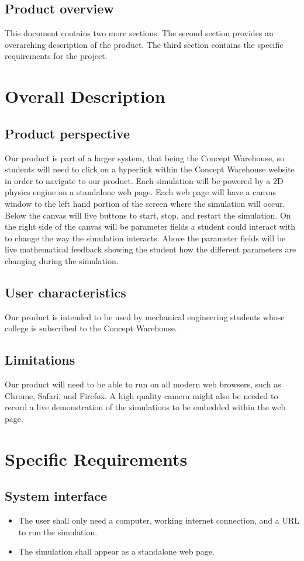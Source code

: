 \subsection{Product overview}
This document contains two more sections. The second section provides an overarching description of the product. The third section contains the specific requirements for the project.
\section{Overall Description}
\subsection{Product perspective}
Our product is part of a larger system, that being the Concept Warehouse, so students will need to click on a hyperlink within the Concept Warehouse website in order to navigate to our product. Each simulation will be powered by a 2D physics engine on a standalone web page. Each web page will have a canvas window to the left hand portion of the screen where the simulation will occur. Below the canvas will live buttons to start, stop, and restart the simulation. On the right side of the canvas will be parameter fields a student could interact with to change the way the simulation interacts. Above the parameter fields will be live mathematical feedback showing the student how the different parameters are changing during the simulation.
\subsection{User characteristics}
Our product is intended to be used by mechanical engineering students whose college is subscribed to the Concept Warehouse.
\subsection{Limitations}
Our product will need to be able to run on all modern web browsers, such as Chrome, Safari, and Firefox. A high quality camera might also be needed to record a live demonstration of the simulations to be embedded within the web page.
\section{Specific Requirements}
\subsection{System interface}
\begin{itemize}
\item The user shall only need a computer, working internet connection, and a URL to run the simulation.
\item The simulation shall appear as a standalone web page.
\end{itemize}
